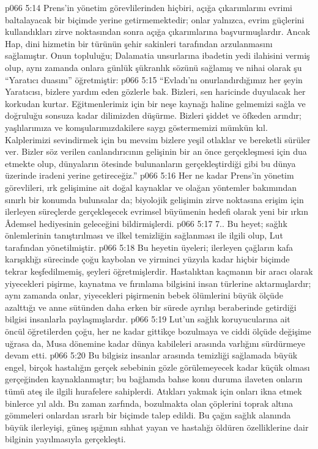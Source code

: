 \vs p066 5:14 Prens’in yönetim görevlilerinden hiçbiri, açığa çıkarımlarını evrimi baltalayacak bir biçimde yerine getirmemektedir; onlar yalnızca, evrim güçlerini kullandıkları zirve noktasından sonra açığa çıkarımlarına başvurmuşlardır. Ancak Hap, dini hizmetin bir türünün şehir sakinleri tarafından arzulanmasını sağlamıştır. Onun topluluğu; Dalamatia unsurlarına ibadetin yedi ilahisini vermiş olup, aynı zamanda onlara günlük şükranlık sözünü sağlamış ve nihai olarak şu “Yaratıcı duasını” öğretmiştir:
\vs p066 5:15 “Evladı’nı onurlandırdığımız her şeyin Yaratıcısı, bizlere yardım eden gözlerle bak. Bizleri, sen haricinde duyulacak her korkudan kurtar. Eğitmenlerimiz için bir neşe kaynağı haline gelmemizi sağla ve doğruluğu sonsuza kadar dilimizden düşürme. Bizleri şiddet ve öfkeden arındır; yaşlılarımıza ve komşularımızdakilere saygı göstermemizi mümkün kıl. Kalplerimizi sevindirmek için bu mevsim bizlere yeşil otlaklar ve bereketli sürüler ver. Bizler söz verilen canlandırıcının gelişinin bir an önce gerçekleşmesi için dua etmekte olup, dünyaların ötesinde bulunanların gerçekleştirdiği gibi bu dünya üzerinde iradeni yerine getireceğiz.”
\vs p066 5:16 Her ne kadar Prens’in yönetim görevlileri, ırk gelişimine ait doğal kaynaklar ve olağan yöntemler bakımından sınırlı bir konumda bulunsalar da; biyolojik gelişimin zirve noktasına erişim için ilerleyen süreçlerde gerçekleşecek evrimsel büyümenin hedefi olarak yeni bir ırkın Âdemsel hediyesinin geleceğini bildirmişlerdi.
\vs p066 5:17 7.. Bu heyet; sağlık önlemlerinin tanıştırılması ve ilkel temizliğin sağlanması ile ilgili olup, Lut tarafından yönetilmiştir.
\vs p066 5:18 Bu heyetin üyeleri; ilerleyen çağların kafa karışıklığı sürecinde çoğu kaybolan ve yirminci yüzyıla kadar hiçbir biçimde tekrar keşfedilmemiş, şeyleri öğretmişlerdir. Hastalıktan kaçmanın bir aracı olarak yiyecekleri pişirme, kaynatma ve fırınlama bilgisini insan türlerine aktarmışlardır; aynı zamanda onlar, yiyecekleri pişirmenin bebek ölümlerini büyük ölçüde azalttığı ve anne sütünden daha erken bir sürede ayrılışı beraberinde getirdiği bilgisi insanlarla paylaşmışlardır.
\vs p066 5:19 Lut’un sağlık koruyucularına ait öncül öğretilerden çoğu, her ne kadar gittikçe bozulmaya ve ciddi ölçüde değişime uğrasa da, Musa dönemine kadar dünya kabileleri arasında varlığını sürdürmeye devam etti.
\vs p066 5:20 Bu bilgisiz insanlar arasında temizliği sağlamada büyük engel, birçok hastalığın gerçek sebebinin gözle görülemeyecek kadar küçük olması gerçeğinden kaynaklanmıştır; bu bağlamda bahse konu duruma ilaveten onların tümü ateş ile ilgili hurafelere sahiplerdi. Atıkları yakmak için onları ikna etmek binlerce yıl aldı. Bu zaman zarfında, bozulmakta olan çöplerini toprak altına gömmeleri onlardan ısrarlı bir biçimde talep edildi. Bu çağın sağlık alanında büyük ilerleyişi, güneş ışığının sıhhat yayan ve hastalığı öldüren özelliklerine dair bilginin yayılmasıyla gerçekleşti.
